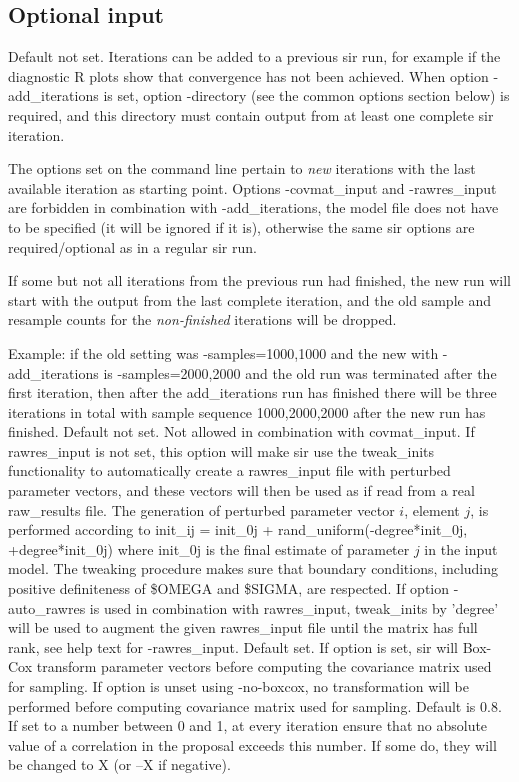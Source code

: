 \subsection{Optional input}
\begin{optionlist}
Default not set. Iterations can be added to a previous sir run, for example if the diagnostic R plots show that convergence has not been achieved. When option -add\_iterations is set, option -directory (see the common options section below) is required, and this directory must contain output from at least one complete sir iteration.
	
The options set on the command line	pertain to \emph{new} iterations with the last available iteration as starting point.
Options -covmat\_input and -rawres\_input are forbidden in combination with -add\_iterations, the model file does not have to be specified (it will be ignored if it is), otherwise the same sir options are required/optional as in a regular sir run.
	
If some but not all iterations from the previous run had finished, the new run will start with the output from the last complete iteration, and the old sample and resample counts for the \emph{non-finished} iterations will be dropped. 

Example: if the old setting was -samples=1000,1000 	and the new with -add\_iterations is -samples=2000,2000 and the old run was terminated after the first iteration, then after the add\_iterations run has finished there will be three iterations in total with sample sequence 1000,2000,2000 after the new run has finished.
\nextopt
{}
Default not set. Not allowed in combination with covmat\_input. If rawres\_input is not set, this option will make sir use the tweak\_inits functionality to automatically create a rawres\_input file with perturbed parameter vectors, and these vectors will then be used as if read from a real raw\_results file.	The generation of perturbed parameter vector $i$, element $j$, is performed according to init\_ij = init\_0j + rand\_uniform(-degree*init\_0j,\\+degree*init\_0j) where init\_0j is the final estimate of parameter $j$ in the input model.	The tweaking procedure makes sure that boundary conditions, including positive definiteness of \$OMEGA and \$SIGMA, are respected.
If option -auto\_rawres is used	in combination with rawres\_input, tweak\_inits by 'degree' will be used to augment the given rawres\_input file until the matrix has full rank, see help text for -rawres\_input. 
\nextopt
{}
Default set. If option is set, sir will Box-Cox transform parameter vectors before computing the covariance matrix used for sampling. If option is unset using -no-boxcox, no transformation will be performed before computing covariance matrix
used for sampling.
\nextopt
\newpage
{}
Default is 0.8. If set to a number between 0 and 1, at every iteration ensure that no absolute value of a correlation in the proposal exceeds this number. If some do, they will be changed to X (or –X if negative). 


\end{optionlist}
